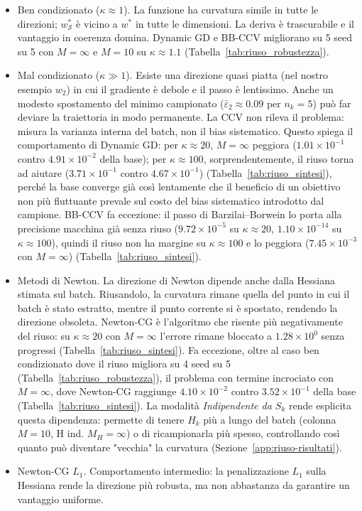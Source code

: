 \documentclass[a4paper,12pt]{article}
\numberwithin{equation}{section}
\numberwithin{figure}{section}
\numberwithin{table}{section}
\begin{document}
\begin{itemize}
\item Ben condizionato ($\kappa \approx 1$). La funzione ha curvatura
  simile in tutte le direzioni; $w^*_{\mathcal{S}}$ è vicino a $w^*$ in tutte
  le dimensioni. La deriva è trascurabile e il vantaggio in coerenza domina.
  Dynamic GD e BB-CCV migliorano su 5 seed su 5 con $M=\infty$ e $M=10$ su
  $\kappa \approx 1.1$ (Tabella~\ref{tab:riuso_robustezza}).
\item Mal condizionato ($\kappa \gg 1$). Esiste una direzione quasi
  piatta (nel nostro esempio $w_2$) in cui il gradiente è debole e il passo
  è lentissimo. Anche un modesto spostamento del minimo campionato
  ($\bar\varepsilon_2 \approx 0.09$ per $n_k=5$) può far deviare la
  traiettoria in modo permanente. La CCV non rileva il problema: misura la
  varianza interna del batch, non il bias sistematico. Questo spiega il
  comportamento di Dynamic GD: per $\kappa \approx 20$, $M=\infty$ peggiora
  ($1.01\times10^{-1}$ contro $4.91\times10^{-2}$ della base); per
  $\kappa \approx 100$, sorprendentemente, il riuso torna ad aiutare
  ($3.71\times10^{-1}$ contro $4.67\times10^{-1}$) (Tabella~\ref{tab:riuso_sintesi}), perché la base converge
  già così lentamente che il beneficio di un obiettivo non più fluttuante
  prevale sul costo del bias sistematico introdotto dal campione. BB-CCV fa eccezione: il passo di Barzilai--Borwein lo porta alla
  precisione macchina già senza riuso ($9.72\times10^{-5}$ su
  $\kappa\approx20$, $1.10\times10^{-14}$ su $\kappa\approx100$), quindi il
  riuso non ha margine su $\kappa\approx100$ e lo peggiora
  ($7.45\times10^{-3}$ con $M=\infty$) (Tabella~\ref{tab:riuso_sintesi}).
\item Metodi di Newton. La direzione di Newton dipende anche dalla
  Hessiana stimata sul batch. Riusandolo, la curvatura rimane quella del punto
  in cui il batch è stato estratto, mentre il punto corrente si è spostato,
  rendendo la direzione obsoleta. Newton-CG è l'algoritmo che risente più
  negativamente del riuso: su $\kappa \approx 20$ con $M=\infty$ l'errore
  rimane bloccato a $1.28\times10^0$ senza progressi (Tabella~\ref{tab:riuso_sintesi}). Fa eccezione, oltre al
  caso ben condizionato dove il riuso migliora su 4 seed su 5 (Tabella~\ref{tab:riuso_robustezza}), il problema
  con termine incrociato con $M=\infty$, dove Newton-CG raggiunge
  $4.10\times10^{-2}$ contro $3.52\times10^{-1}$ della base (Tabella~\ref{tab:riuso_sintesi}). La modalità
  \emph{Indipendente da $S_k$} rende esplicita questa dipendenza: permette di
  tenere $H_k$ più a lungo del batch (colonna $M{=}10$, H ind. $M_H{=}\infty$)
  o di ricampionarla più spesso, controllando così quanto può diventare
  "vecchia" la curvatura (Sezione~\ref{app:riuso-risultati}).
\item Newton-CG $L_1$. Comportamento intermedio: la penalizzazione
  $L_1$ sulla Hessiana rende la direzione più robusta, ma non abbastanza da
  garantire un vantaggio uniforme.
\end{itemize}
\end{document}
